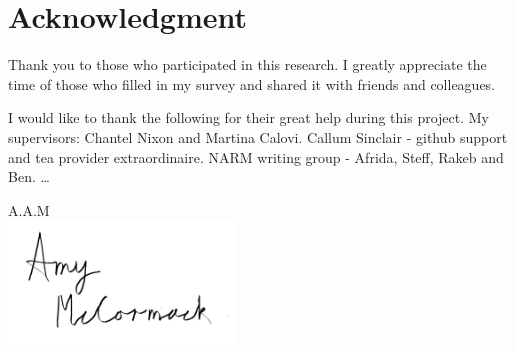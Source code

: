 \section{Acknowledgment}
Thank you to those who participated in this research. I greatly appreciate the time of those who filled in my survey and shared it with friends and colleagues.

I would like to thank the following for their great help during this project. My supervisors: Chantel Nixon and Martina Calovi. Callum Sinclair - github support and tea provider extraordinaire. NARM writing group - Afrida, Steff, Rakeb and Ben.  \ldots



\begin{flushright}
A.A.M\\[1pc]
\includegraphics[width=6cm]{fig/to use signature png.png}
\end{flushright}
